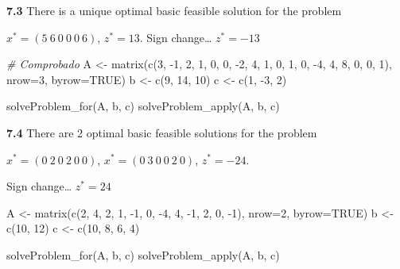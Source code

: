 \documentclass[
]{article}
\newenvironment{Shaded}{\begin{snugshade}}{\end{snugshade}}
\newcommand{\AttributeTok}[1]{\textcolor[rgb]{0.77,0.63,0.00}{#1}}
\newcommand{\CommentTok}[1]{\textcolor[rgb]{0.56,0.35,0.01}{\textit{#1}}}
\newcommand{\ConstantTok}[1]{\textcolor[rgb]{0.00,0.00,0.00}{#1}}
\newcommand{\DecValTok}[1]{\textcolor[rgb]{0.00,0.00,0.81}{#1}}
\newcommand{\FunctionTok}[1]{\textcolor[rgb]{0.00,0.00,0.00}{#1}}
\newcommand{\NormalTok}[1]{#1}
\newcommand{\OtherTok}[1]{\textcolor[rgb]{0.56,0.35,0.01}{#1}}
\newcommand{\SpecialCharTok}[1]{\textcolor[rgb]{0.00,0.00,0.00}{#1}}
\begin{document}
\textbf{7.3} There is a unique optimal basic feasible solution for the
problem

\(x^*= (5\ 6\ 0\ 0\ 0\ 6)\), \(z^*= 13\). Sign change\ldots{}
\(z^*= -13\)

\begin{Shaded}
\begin{Highlighting}[]
\CommentTok{\# Comprobado}
\NormalTok{A }\OtherTok{\textless{}{-}} \FunctionTok{matrix}\NormalTok{(}\FunctionTok{c}\NormalTok{(}\DecValTok{3}\NormalTok{, }\SpecialCharTok{{-}}\DecValTok{1}\NormalTok{, }\DecValTok{2}\NormalTok{, }\DecValTok{1}\NormalTok{, }\DecValTok{0}\NormalTok{, }\DecValTok{0}\NormalTok{, }\SpecialCharTok{{-}}\DecValTok{2}\NormalTok{, }\DecValTok{4}\NormalTok{, }\DecValTok{1}\NormalTok{, }\DecValTok{0}\NormalTok{, }\DecValTok{1}\NormalTok{, }\DecValTok{0}\NormalTok{, }\SpecialCharTok{{-}}\DecValTok{4}\NormalTok{, }\DecValTok{4}\NormalTok{, }\DecValTok{8}\NormalTok{, }\DecValTok{0}\NormalTok{, }\DecValTok{0}\NormalTok{, }\DecValTok{1}\NormalTok{), }\AttributeTok{nrow=}\DecValTok{3}\NormalTok{, }\AttributeTok{byrow=}\ConstantTok{TRUE}\NormalTok{)}
\NormalTok{b }\OtherTok{\textless{}{-}} \FunctionTok{c}\NormalTok{(}\DecValTok{9}\NormalTok{, }\DecValTok{14}\NormalTok{, }\DecValTok{10}\NormalTok{)}
\NormalTok{c }\OtherTok{\textless{}{-}} \FunctionTok{c}\NormalTok{(}\DecValTok{1}\NormalTok{, }\SpecialCharTok{{-}}\DecValTok{3}\NormalTok{, }\DecValTok{2}\NormalTok{)}

\FunctionTok{solveProblem\_for}\NormalTok{(A, b, c)}
\FunctionTok{solveProblem\_apply}\NormalTok{(A, b, c)}
\end{Highlighting}
\end{Shaded}

\textbf{7.4} There are 2 optimal basic feasible solutions for the
problem

\(x^*= (0\ 2\ 0\ 2\ 0\ 0)\), \(x^*= (0\ 3\ 0\ 0\ 2\ 0)\), \(z^*= -24\).

Sign change\ldots{} \(z^*= 24\)

\begin{Shaded}
\begin{Highlighting}[]
\NormalTok{A }\OtherTok{\textless{}{-}} \FunctionTok{matrix}\NormalTok{(}\FunctionTok{c}\NormalTok{(}\DecValTok{2}\NormalTok{, }\DecValTok{4}\NormalTok{, }\DecValTok{2}\NormalTok{, }\DecValTok{1}\NormalTok{, }\SpecialCharTok{{-}}\DecValTok{1}\NormalTok{, }\DecValTok{0}\NormalTok{, }\SpecialCharTok{{-}}\DecValTok{4}\NormalTok{, }\DecValTok{4}\NormalTok{, }\SpecialCharTok{{-}}\DecValTok{1}\NormalTok{, }\DecValTok{2}\NormalTok{, }\DecValTok{0}\NormalTok{, }\SpecialCharTok{{-}}\DecValTok{1}\NormalTok{), }\AttributeTok{nrow=}\DecValTok{2}\NormalTok{, }\AttributeTok{byrow=}\ConstantTok{TRUE}\NormalTok{)}
\NormalTok{b }\OtherTok{\textless{}{-}} \FunctionTok{c}\NormalTok{(}\DecValTok{10}\NormalTok{, }\DecValTok{12}\NormalTok{)}
\NormalTok{c }\OtherTok{\textless{}{-}} \FunctionTok{c}\NormalTok{(}\DecValTok{10}\NormalTok{, }\DecValTok{8}\NormalTok{, }\DecValTok{6}\NormalTok{, }\DecValTok{4}\NormalTok{)}

\FunctionTok{solveProblem\_for}\NormalTok{(A, b, c)}
\FunctionTok{solveProblem\_apply}\NormalTok{(A, b, c)}
\end{Highlighting}
\end{Shaded}
\end{document}
